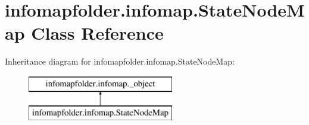 \hypertarget{classinfomapfolder_1_1infomap_1_1StateNodeMap}{}\section{infomapfolder.\+infomap.\+State\+Node\+Map Class Reference}
\label{classinfomapfolder_1_1infomap_1_1StateNodeMap}
Inheritance diagram for infomapfolder.\+infomap.\+State\+Node\+Map\+:\begin{figure}[H]
\begin{center}
\leavevmode
\includegraphics[height=2.000000cm]{classinfomapfolder_1_1infomap_1_1StateNodeMap}
\end{center}
\end{figure}
